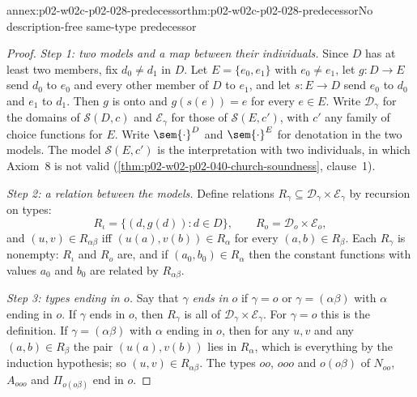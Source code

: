 \begin{annexitem}{annex:p02-w02c-p02-028-predecessor}{thm:p02-w02c-p02-028-predecessor}{No description-free same-type predecessor}
\begin{proof}
\emph{Step 1: two models and a map between their individuals.}  Since
\(D\) has at least two members, fix \(d_0\ne d_1\) in \(D\).  Let
\(E=\{e_0,e_1\}\) with \(e_0\ne e_1\), let \(g:D\to E\) send \(d_0\) to
\(e_0\) and every other member of \(D\) to \(e_1\), and let \(s:E\to D\)
send \(e_0\) to \(d_0\) and \(e_1\) to \(d_1\).  Then \(g\) is onto and
\(g(s(e))=e\) for every \(e\in E\).  Write \(\mathcal D_\gamma\) for the
domains of \(\mathcal S(D,c)\) and \(\mathcal E_\gamma\) for those of
\(\mathcal S(E,c')\), with \(c'\) any family of choice functions for \(E\).
Write \(\sem{\cdot}^D\) and \(\sem{\cdot}^E\) for denotation in the two
models.  The model \(\mathcal S(E,c')\) is the interpretation with two
individuals, in which Axiom~8 is not valid
(\cref{thm:p02-w02-p02-040-church-soundness}, clause~1).

\emph{Step 2: a relation between the models.}  Define relations
\(R_\gamma\subseteq\mathcal D_\gamma\times\mathcal E_\gamma\) by recursion
on types:
\[
 R_\iota=\{(d,g(d)):d\in D\},\qquad
 R_o=\mathcal D_o\times\mathcal E_o,
\]
and \((u,v)\in R_{\alpha\beta}\) iff \((u(a),v(b))\in R_\alpha\) for every
\((a,b)\in R_\beta\).  Each \(R_\gamma\) is nonempty: \(R_\iota\) and \(R_o\)
are, and if \((a_0,b_0)\in R_\alpha\) then the constant functions with
values \(a_0\) and \(b_0\) are related by \(R_{\alpha\beta}\).

\emph{Step 3: types ending in \(o\).}  Say that \(\gamma\) \emph{ends in}
\(o\) if \(\gamma=o\) or \(\gamma=(\alpha\beta)\) with \(\alpha\) ending in
\(o\).  If \(\gamma\) ends in \(o\), then \(R_\gamma\) is all of
\(\mathcal D_\gamma\times\mathcal E_\gamma\).  For \(\gamma=o\) this is the
definition.  If \(\gamma=(\alpha\beta)\) with \(\alpha\) ending in \(o\),
then for any \(u,v\) and any \((a,b)\in R_\beta\) the pair \((u(a),v(b))\)
lies in \(R_\alpha\), which is everything by the induction hypothesis; so
\((u,v)\in R_{\alpha\beta}\).  The types \(oo\), \(ooo\) and \(o(o\beta)\)
of \(N_{oo}\), \(A_{ooo}\) and \(\Pi_{o(o\beta)}\) end in \(o\).


\end{proof}
\end{annexitem}
